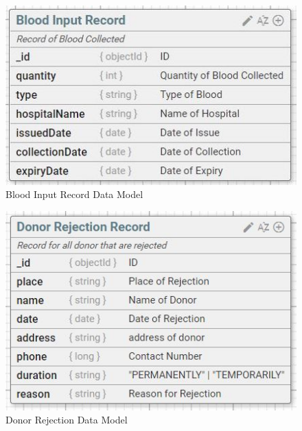 \documentclass[BTech]{srmuthesis}
\begin{document}
\begin{figure}[H]
	\centering
	\includegraphics[scale=0.6]{input_blood_input_record.jpeg}
	\caption{Blood Input Record Data Model}
\end{figure}
\begin{figure}[H]
	\centering
	\includegraphics[scale=0.6]{input_donor_rejection.jpeg}
	\caption{Donor Rejection Data Model}
\end{figure}
\end{document}
